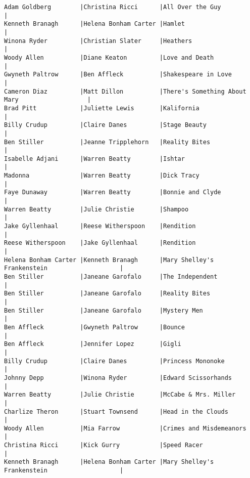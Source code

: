 \documentclass{article}
\begin{document}
\begin{verbatim}
Adam Goldberg        |Christina Ricci      |All Over the Guy                               |
Kenneth Branagh      |Helena Bonham Carter |Hamlet                                         |
Winona Ryder         |Christian Slater     |Heathers                                       |
Woody Allen          |Diane Keaton         |Love and Death                                 |
Gwyneth Paltrow      |Ben Affleck          |Shakespeare in Love                            |
Cameron Diaz         |Matt Dillon          |There's Something About Mary                   |
Brad Pitt            |Juliette Lewis       |Kalifornia                                     |
Billy Crudup         |Claire Danes         |Stage Beauty                                   |
Ben Stiller          |Jeanne Tripplehorn   |Reality Bites                                  |
Isabelle Adjani      |Warren Beatty        |Ishtar                                         |
Madonna              |Warren Beatty        |Dick Tracy                                     |
Faye Dunaway         |Warren Beatty        |Bonnie and Clyde                               |
Warren Beatty        |Julie Christie       |Shampoo                                        |
Jake Gyllenhaal      |Reese Witherspoon    |Rendition                                      |
Reese Witherspoon    |Jake Gyllenhaal      |Rendition                                      |
Helena Bonham Carter |Kenneth Branagh      |Mary Shelley's Frankenstein                    |
Ben Stiller          |Janeane Garofalo     |The Independent                                |
Ben Stiller          |Janeane Garofalo     |Reality Bites                                  |
Ben Stiller          |Janeane Garofalo     |Mystery Men                                    |
Ben Affleck          |Gwyneth Paltrow      |Bounce                                         |
Ben Affleck          |Jennifer Lopez       |Gigli                                          |
Billy Crudup         |Claire Danes         |Princess Mononoke                              |
Johnny Depp          |Winona Ryder         |Edward Scissorhands                            |
Warren Beatty        |Julie Christie       |McCabe & Mrs. Miller                           |
Charlize Theron      |Stuart Townsend      |Head in the Clouds                             |
Woody Allen          |Mia Farrow           |Crimes and Misdemeanors                        |
Christina Ricci      |Kick Gurry           |Speed Racer                                    |
Kenneth Branagh      |Helena Bonham Carter |Mary Shelley's Frankenstein                    |

\end{verbatim}
\end{document}
